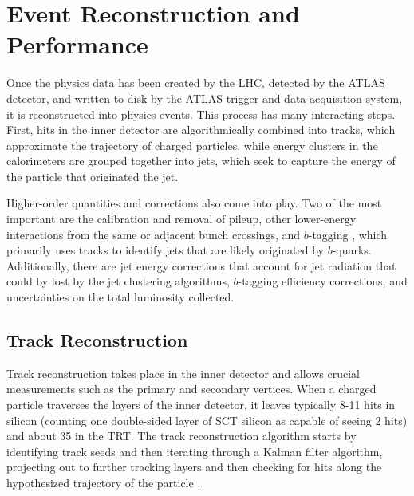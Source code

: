  

\chapter[Reconstruction and Performance]{Event Reconstruction and Performance}
Once the physics data has been created by the LHC, detected by the ATLAS detector, and written to 
disk by the ATLAS trigger and data acquisition system, it is reconstructed into physics events.  This process has 
many interacting steps.  First, hits in the inner detector are algorithmically combined into tracks, which approximate the 
trajectory of charged particles, while energy clusters in the calorimeters are grouped together into jets, which seek to 
capture the energy of the particle that originated the jet.  

Higher-order quantities and corrections also come into play.  Two of the most important are the calibration and removal of 
pileup, other lower-energy interactions from the same or adjacent bunch crossings, and $b$-tagging
, which primarily uses tracks to identify jets that are likely originated by $b$-quarks.  Additionally, 
there are jet energy corrections that account for jet radiation that could by lost by the jet clustering algorithms, 
$b$-tagging efficiency corrections, and uncertainties on the total luminosity collected. 



\section{Track Reconstruction}
\label{sec:trk_reco}
Track reconstruction takes place in the inner detector and allows crucial measurements such as the primary and secondary vertices.  
When a charged particle traverses the layers of the inner detector, it leaves typically 8-11 hits in 
silicon (counting one double-sided layer of SCT silicon as capable of seeing 2 hits) and about 
35 in the TRT.  The track reconstruction algorithm  
starts by identifying track seeds and then iterating through a Kalman filter algorithm, projecting out to further tracking layers 
and then checking for hits along the hypothesized trajectory of the particle \cite{newt}.  


